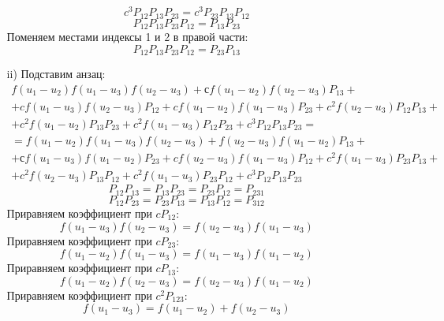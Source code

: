 \documentclass[12pt]{article}
\theoremstyle{definition}
\begin{document}
\begin{enumerate}
\begin{itemize}
\begin{equation}
            c^3P_{12}P_{13}P_{23}=c^3P_{23}P_{13}P_{12}
        \end{equation}
        \begin{equation}
            P_{12}P_{13}P_{23}P_{12}=P_{13}P_{23}
        \end{equation}
        Поменяем местами индексы 1 и 2 в правой части:
        \begin{equation}
            P_{12}P_{13}P_{23}P_{12}=P_{23}P_{13}
        \end{equation}
        \item[ii)] Подставим анзац:
        \begin{multline}
            f(u_1-u_2)f(u_1-u_3)f(u_2-u_3)+сf(u_1-u_2)f(u_2-u_3)P_{13}+\\+cf(u_1-u_3)f(u_2-u_3)P_{12}+cf(u_1-u_2)f(u_1-u_3)P_{23}+c^2f(u_2-u_3)P_{12}P_{13}+\\+c^2f(u_1-u_2)P_{13}P_{23}+c^2f(u_1-u_3)P_{12}P_{23}+c^3P_{12}P_{13}P_{23}=\\=f(u_1-u_2)f(u_1-u_3)f(u_2-u_3)+f(u_2-u_3)f(u_1-u_2)P_{13}+\\+сf(u_1-u_3)f(u_1-u_2)P_{23}+cf(u_2-u_3)f(u_1-u_3)P_{12}+c^2f(u_1-u_3)P_{23}P_{13}+\\+c^2f(u_2-u_3)P_{13}P_{12}+c^2f(u_1-u_3)P_{23}P_{12}+c^3P_{12}P_{13}P_{23}
        \end{multline}
        \begin{equation}
            P_{12}P_{13}=P_{13}P_{23}=P_{23}P_{12}=P_{231}
        \end{equation}
        \begin{equation}
            P_{12}P_{23}=P_{23}P_{13}=P_{13}P_{12}=P_{312}
        \end{equation}
        Приравняем коэффициент при $cP_{12}$:
        \begin{equation}
            f(u_1-u_3)f(u_2-u_3)=f(u_2-u_3)f(u_1-u_3)
        \end{equation}
        Приравняем коэффициент при $cP_{23}$:
        \begin{equation}
            f(u_1-u_2)f(u_1-u_3)=f(u_1-u_3)f(u_1-u_2)
        \end{equation}
        Приравняем коэффициент при $cP_{13}$:
        \begin{equation}
            f(u_1-u_2)f(u_2-u_3)=f(u_2-u_3)f(u_1-u_2)
        \end{equation}
        Приравняем коэффициент при $c^2P_{123}$:
        \begin{equation}
            f(u_1-u_3)=f(u_1-u_2)+f(u_2-u_3)

\end{equation}
\end{itemize}
\end{enumerate}
\end{document}
